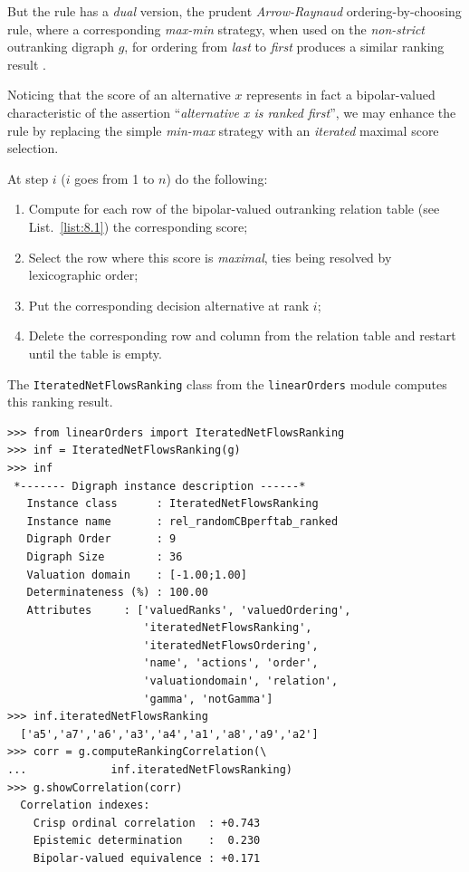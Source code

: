 But the \Kohler rule has a \emph{dual} version, the prudent \emph{Arrow-Raynaud} ordering-by-choosing rule, where a corresponding \emph{max-min} strategy, when used on the \emph{non-strict} outranking digraph $g$, for ordering from \emph{last} to \emph{first} produces a similar ranking result \citep{ARR-1986}.

Noticing that the \NetFlows score of an alternative $x$ represents in fact a bipolar-valued characteristic of the assertion ``\emph{alternative x is ranked first}'', we may enhance the \Kohler rule by replacing the simple \emph{min-max} strategy with an \emph{iterated} maximal \NetFlows score selection.

\begin{definition}\label{def:8.5}
  
\noindent At step $i$ ($i$ goes from 1 to $n$) do the following:
\begin{enumerate}[leftmargin=0.5cm,rightmargin=0.5cm,topsep=1pt]
\item Compute for each row of the bipolar-valued outranking relation table (see List.~\vref{list:8.1}) the corresponding \NetFlows score;
\item Select the row where this score is \emph{maximal}, ties being resolved by lexicographic order;
\item Put the corresponding decision alternative at rank $i$;
\item Delete the corresponding row and column from the relation table and restart until the table is empty.
\end{enumerate}
\end{definition}

The \texttt{IteratedNetFlowsRanking} class from the \texttt{linearOrders} module computes this ranking result. 
\begin{lstlisting}[caption={Ranking-by-choosing with iterated maximal \NetFlows scores},label=list:8.14]   
>>> from linearOrders import IteratedNetFlowsRanking  
>>> inf = IteratedNetFlowsRanking(g)
>>> inf
 *------- Digraph instance description ------*
   Instance class      : IteratedNetFlowsRanking
   Instance name       : rel_randomCBperftab_ranked
   Digraph Order       : 9
   Digraph Size        : 36
   Valuation domain    : [-1.00;1.00]
   Determinateness (%) : 100.00
   Attributes     : ['valuedRanks', 'valuedOrdering',
                     'iteratedNetFlowsRanking',
                     'iteratedNetFlowsOrdering',
                     'name', 'actions', 'order',
                     'valuationdomain', 'relation',
                     'gamma', 'notGamma']
>>> inf.iteratedNetFlowsRanking
  ['a5','a7','a6','a3','a4','a1','a8','a9','a2']
>>> corr = g.computeRankingCorrelation(\
...             inf.iteratedNetFlowsRanking)
>>> g.showCorrelation(corr)
  Correlation indexes:
    Crisp ordinal correlation  : +0.743
    Epistemic determination    :  0.230
    Bipolar-valued equivalence : +0.171
\end{lstlisting}


